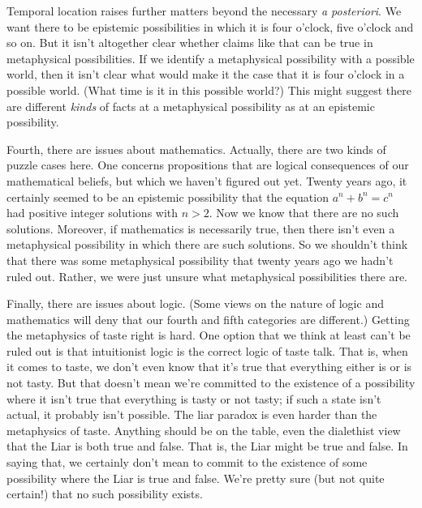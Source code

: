\documentclass[
  10pt,
  letterpaper,
  DIV=11,
  numbers=noendperiod,
  twoside]{scrartcl}
\begin{document}
Temporal location raises further matters beyond the necessary \emph{a
posteriori}. We want there to be epistemic possibilities in which it is
four o'clock, five o'clock and so on. But it isn't altogether clear
whether claims like that can be true in metaphysical possibilities. If
we identify a metaphysical possibility with a possible world, then it
isn't clear what would make it the case that it is four o'clock in a
possible world. (What time is it in this possible world?) This might
suggest there are different \emph{kinds} of facts at a metaphysical
possibility as at an epistemic possibility.

Fourth, there are issues about mathematics. Actually, there are two
kinds of puzzle cases here. One concerns propositions that are logical
consequences of our mathematical beliefs, but which we haven't figured
out yet. Twenty years ago, it certainly seemed to be an epistemic
possibility that the equation \(a^n + b^n = c^n\) had positive integer
solutions with \(n > 2\). Now we know that there are no such solutions.
Moreover, if mathematics is necessarily true, then there isn't even a
metaphysical possibility in which there are such solutions. So we
shouldn't think that there was some metaphysical possibility that twenty
years ago we hadn't ruled out. Rather, we were just unsure what
metaphysical possibilities there are.

Finally, there are issues about logic. (Some views on the nature of
logic and mathematics will deny that our fourth and fifth categories are
different.) Getting the metaphysics of taste right is hard. One option
that we think at least can't be ruled out is that intuitionist logic is
the correct logic of taste talk. That is, when it comes to taste, we
don't even know that it's true that everything either is or is not
tasty. But that doesn't mean we're committed to the existence of a
possibility where it isn't true that everything is tasty or not tasty;
if such a state isn't actual, it probably isn't possible. The liar
paradox is even harder than the metaphysics of taste. Anything should be
on the table, even the dialethist view that the Liar is both true and
false. That is, the Liar might be true and false. In saying that, we
certainly don't mean to commit to the existence of some possibility
where the Liar is true and false. We're pretty sure (but not quite
certain!) that no such possibility exists.
\end{document}
